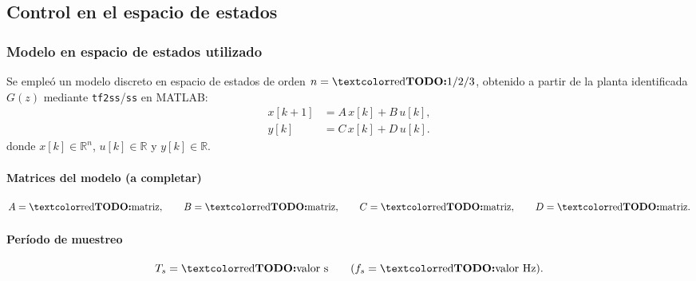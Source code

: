 
\subsection{Control en el espacio de estados}
\label{sec:ss_control}

\subsubsection{Modelo en espacio de estados utilizado}
\label{sec:ss_modelo}

Se empleó un modelo discreto en espacio de estados de orden \(n=\TODOm{1/2/3}\), obtenido a partir de la planta identificada \(G(z)\) mediante \texttt{tf2ss}/\texttt{ss} en MATLAB:
\begin{equation}
	\label{eq:ss_discreto}
	\begin{aligned}
		x[k+1] &= A\,x[k] + B\,u[k],\\
		y[k]   &= C\,x[k] + D\,u[k].
	\end{aligned}
\end{equation}
donde \(x[k]\in\mathbb{R}^{n}\), \(u[k]\in\mathbb{R}\) y \(y[k]\in\mathbb{R}\).

\paragraph{Matrices del modelo (a completar)}
\[
A=\TODOm{\text{matriz}},\qquad
B=\TODOm{\text{matriz}},\qquad
C=\TODOm{\text{matriz}},\qquad
D=\TODOm{\text{matriz}}.
\]

\paragraph{Período de muestreo}
\[
T_s=\TODOm{\text{valor}}\ \text{s}\qquad (f_s=\TODOm{\text{valor}}\ \text{Hz}).
\]
